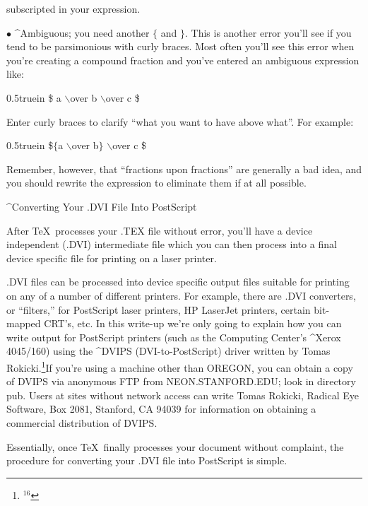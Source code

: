 subscripted in your expression.
\bigskip\par\noindent
$\bullet$ {\twlbf ^{Ambiguous; you need another $\{$} and $\}$.} \quad 
This is another error you'll see if you tend to be parsimonious with curly
braces. Most often you'll see this error when you're creating a compound 
fraction and you've entered an ambiguous expression like:
\bigskip\par\noindent\hglue 0.5truein
{\twltt \$ a $\backslash$over b $\backslash$over c \$}
\bigskip\par\noindent
Enter curly braces to clarify ``what you want to have above what''. For
example:
\bigskip\par\noindent\hglue 0.5truein
{\twltt \${}$\{${}a $\backslash$over b$\}$ $\backslash$over c \$}
\bigskip\par\noindent
Remember, however, that ``fractions upon fractions'' are generally a bad
idea, and you should rewrite the expression to eliminate them if at all
possible.
\vfill\eject
\centerline{\twlbf ^{Converting Your .DVI File Into PostScript}}
\bigskip\par\noindent
After \TeX\ processes your {\twltt .TEX} file without error, you'll have a
{\twlit device independent}
({\twltt .DVI}) intermediate file which you can then 
process into a final {\twlit device specific}
file for printing on a laser printer.
\bigskip\par\noindent
{\twltt .DVI} files can be processed into device specific output files
suitable for printing on any of a number of different printers. For example,
there are {\twltt .DVI} converters, or ``filters,'' 
for PostScript laser printers,
HP LaserJet printers, certain bit-mapped CRT's, etc.  In this 
write-up we're only going to explain how you can write output for PostScript
printers (such as the Computing Center's ^{Xerox 4045/160}) using the {\twltt
^{DVIPS}} (DVI-to-PostScript) driver written by 
Tomas Rokicki.\footnote{$^{16}$}{If you're using a machine other than
OREGON, you can obtain a copy of {\twltt DVIPS} via anonymous FTP from 
{\twltt NEON.STANFORD.EDU}; look in directory {\twltt pub}.
Users at sites without network access can write Tomas Rokicki, Radical 
Eye Software, Box 2081, Stanford, CA 94039 for information on obtaining a
commercial distribution of DVIPS.}
\bigskip\par\noindent
Essentially, once \TeX\ finally processes your document without complaint,
the procedure for 
converting your {\twltt .DVI} file into PostScript is simple.
